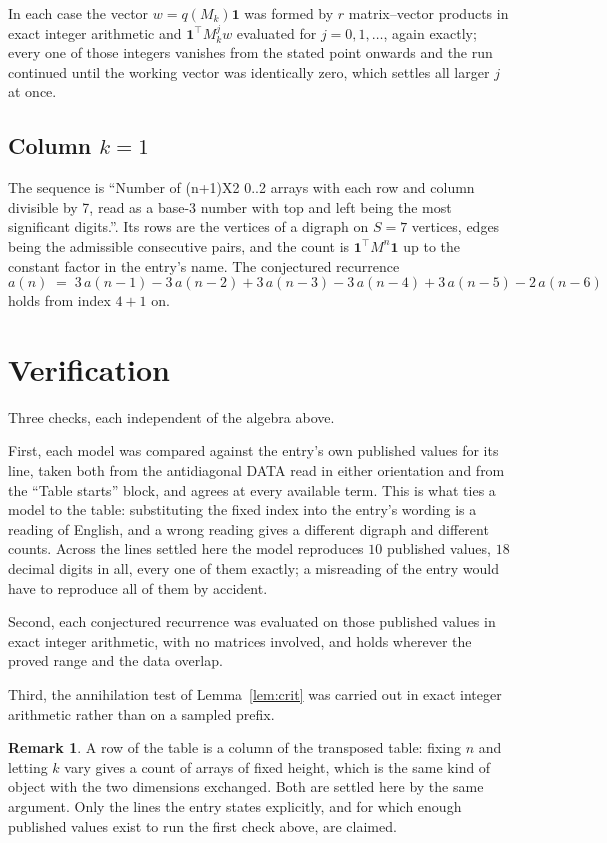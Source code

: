 \documentclass[11pt,a4paper]{article}
\theoremstyle{plain}
\theoremstyle{definition}
\newtheorem{remark}[theorem]{Remark}
\begin{document}
In each case the vector $w=q(M_k)\mathbf{1}$ was formed by $r$ matrix--vector products in
exact integer arithmetic and $\mathbf{1}^{\!\top}M_k^{j}w$ evaluated for $j=0,1,\dots$,
again exactly; every one of those integers vanishes from the stated point onwards and the run
continued until the working vector was identically zero, which settles all larger $j$ at once.

\subsection*{Column $k$$=1$}
The sequence is ``Number of (n+1)X2 0..2 arrays with each row and column divisible by 7, read as a base-3 number with top and left being the most significant digits.''. Its rows are the vertices of a digraph on
$S=7$ vertices, edges being the admissible consecutive pairs, and the count is
$\mathbf{1}^{\!\top}M^{n}\mathbf{1}$ up to the constant factor in the entry's name.
The conjectured recurrence
\[
a(n)\;=\;3\,a(n-1) - 3\,a(n-2) + 3\,a(n-3) - 3\,a(n-4) + 3\,a(n-5) - 2\,a(n-6)
\]
holds from index $4+1$ on.

\section{Verification}

Three checks, each independent of the algebra above.

First, each model was compared against the entry's own published values for its line, taken
both from the antidiagonal DATA read in either orientation and from the ``Table starts''
block, and agrees at every available term. This is what ties a model to the table:
substituting the fixed index into the entry's wording is a reading of English, and a wrong
reading gives a different digraph and different counts. Across the lines settled here the
model reproduces $10$ published values, $18$ decimal digits in all, every one of
them exactly; a misreading of the entry would have to reproduce all of them by accident.

Second, each conjectured recurrence was evaluated on those published values in exact
integer arithmetic, with no matrices involved, and holds wherever the proved range and the
data overlap.

Third, the annihilation test of Lemma~\ref{lem:crit} was carried out in exact integer
arithmetic rather than on a sampled prefix.

\begin{remark}
A row of the table is a column of the transposed table: fixing $n$ and letting $k$ vary gives a
count of arrays of fixed height, which is the same kind of object with the two dimensions
exchanged. Both are settled here by the same argument. Only the lines the entry states
explicitly, and for which enough published values exist to run the first check above, are
claimed.
\end{remark}
\end{document}
